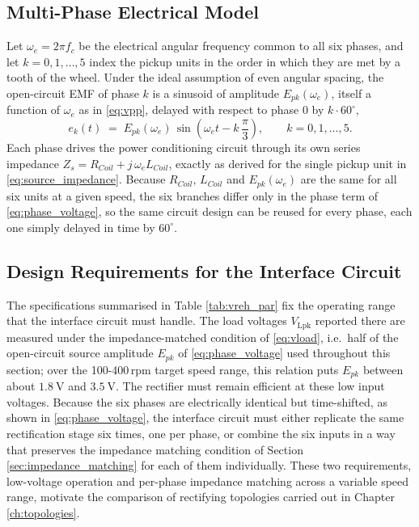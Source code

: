 \subsection{Multi-Phase Electrical Model}

Let $\omega_e=2\pi f_c$ be the electrical angular frequency common to all six phases, and let $k=0,1,\dots,5$ index the pickup units in the order in which they are met by a tooth of the wheel. Under the ideal assumption of even angular spacing, the open-circuit EMF of phase $k$ is a sinusoid of amplitude $E_{pk}(\omega_e)$, itself a function of $\omega_e$ as in \eqref{eq:vpp}, delayed with respect to phase $0$ by $k\cdot 60^\circ$,
\begin{equation}
    e_k(t) \;=\; E_{pk}(\omega_e)\,\sin\!\left(\omega_e t - k\,\frac{\pi}{3}\right), \qquad k=0,1,\dots,5.
    \label{eq:phase_voltage}
\end{equation}
Each phase drives the power conditioning circuit through its own series impedance $Z_s=R_{Coil}+j\,\omega_e L_{Coil}$, exactly as derived for the single pickup unit in \eqref{eq:source_impedance}. Because $R_{Coil}$, $L_{Coil}$ and $E_{pk}(\omega_e)$ are the same for all six units at a given speed, the six branches differ only in the phase term of \eqref{eq:phase_voltage}, so the same circuit design can be reused for every phase, each one simply delayed in time by $60^\circ$.

\subsection{Design Requirements for the Interface Circuit}

The specifications summarised in Table \ref{tab:vreh_par} fix the operating range that the interface circuit must handle. The load voltages $V_\text{Lpk}$ reported there are measured under the impedance-matched condition of \eqref{eq:vload}, i.e.\ half of the open-circuit source amplitude $E_{pk}$ of \eqref{eq:phase_voltage} used throughout this section; over the 100-400\,rpm target speed range, this relation puts $E_{pk}$ between about $1.8\ \text{V}$ and $3.5\ \text{V}$. The rectifier must remain efficient at these low input voltages. Because the six phases are electrically identical but time-shifted, as shown in \eqref{eq:phase_voltage}, the interface circuit must either replicate the same rectification stage six times, one per phase, or combine the six inputs in a way that preserves the impedance matching condition of Section \ref{sec:impedance_matching} for each of them individually. These two requirements, low-voltage operation and per-phase impedance matching across a variable speed range, motivate the comparison of rectifying topologies carried out in Chapter \ref{ch:topologies}.